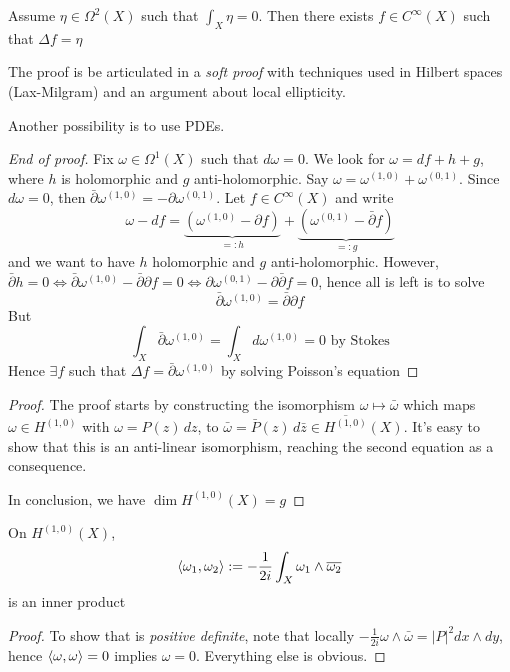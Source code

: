 \begin{lemma}{}
    Assume \(\eta \in \Omega^2{(X)}\) such that \(\int_X \eta = 0\). Then there
    exists \(f \in C^{\infty}{(X)}\) such that \(\Delta f = \eta\) 
\end{lemma}
The proof is be articulated in a \emph{soft proof} with techniques used in
Hilbert spaces (Lax-Milgram) and an argument about local ellipticity.

Another possibility is to use PDEs.

\begin{proof}[End of proof]
    Fix \(\omega \in \Omega^{1}{(X)}\) such that \(d\omega = 0\). We look for
    \(\omega = df + h + g\), where \(h\) is holomorphic and \(g\)
    anti-holomorphic. Say \(\omega = \omega^{{(1,0)}} + \omega^{{(0,1)}}\).
    Since \(d\omega = 0\), then \(\bar{\partial}\omega^{{(1,0)}} = -\partial
    \omega^{{(0,1)}}\). Let \(f \in C^{\infty}{(X)}\) and write \[\omega - df =
        \underbrace{{\left(  \omega^{{(1,0)}} - \partial f \right)}}_{=:h}  +
        \underbrace{{\left( \omega^{{(0,1)}} -
    \bar{\partial} f\right)}}_{=:g}  \] 
    and we want to have \(h\) holomorphic and \(g\) anti-holomorphic. However,
    \(\bar{\partial}h = 0 \iff \bar{\partial} \omega^{{(1,0)}} -
    \bar{\partial}\partial f = 0 \iff \partial \omega^{{(0,1)}} - \partial
    \bar{\partial} f = 0\), hence all is left is to solve
    \[
      \bar{\partial} \omega^{{(1,0)}} = \bar{\partial} \partial f
    \]
    But 
    \[
      \int_X \bar{\partial} \omega^{{(1,0)}} = \int_{X} d \omega^{{(1,0)}} = 0
      \text{ by Stokes}
    \]
    Hence \(\exists f \) such that \(\Delta f = \bar{\partial}
    \omega^{{(1,0)}}\) by solving Poisson's equation
\end{proof}


\begin{proof}{}
    The proof starts by constructing the isomorphism \(\omega \mapsto
    \bar{\omega}\) which maps
    \(\omega \in H^{{(1,0)}}\) with \(\omega = P{(z)} \, dz\), to 
    \(\bar{\omega} = \bar{P}{(z)} \, d\bar{z} \in \overline{H^{{(1,0)}}}{(X)}\).
    It's easy to show that this is an anti-linear isomorphism, reaching the
    second equation as a consequence.


    In conclusion, we have \(\dim H^{{(1,0)}}{(X)} = g\) 
\end{proof}

\begin{proposition}{}
    On \(H^{{(1,0)}}{(X)}\), 
    \[
      {\left\langle\omega_{1}, \omega_{2}\right\rangle} := -\frac{1}{2i} \int_X \omega_{1} \wedge
      \overline{\omega_{2}}
    \]
    is an inner product
\end{proposition}
\begin{proof}{}
    To show that is \emph{positive definite}, note that locally \(-\frac{1}{2i}
    \omega \wedge \bar{\omega} = |P|^2 dx \wedge dy\), hence \({\left\langle\omega,
    \omega\right\rangle} = 0\) implies \(\omega = 0\). Everything else is obvious.
\end{proof}

